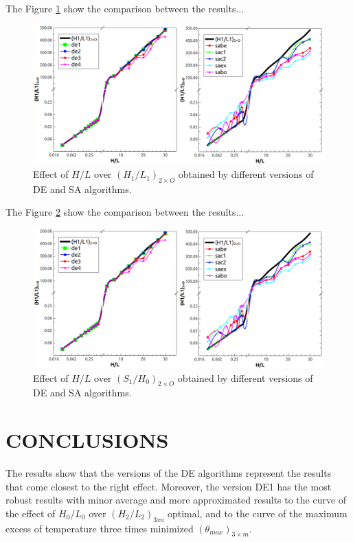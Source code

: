 \documentclass[12pt,fleqn]{article}
\begin{document}
The Figure \ref{figure07} show the comparison between the results...

\begin{figure}[H]
\centering
\includegraphics[width=1\linewidth]{imgs/5dof/de_sa_hl_h1l1.png}
\caption{ {\small Effect of $H/L$ over ${(H_{1}/L_{1})_{2\times O}}$ obtained by different versions of DE and SA algorithms.}}
\label{figure07}
\end{figure}


The Figure \ref{figure08} show the comparison between the results...


\begin{figure}[H]
\centering
\includegraphics[width=1\linewidth]{imgs/5dof/de_sa_hl_h1l1.png}
\caption{ {\small Effect of $H/L$ over ${(S_{1}/H_{0})_{2\times O}}$ obtained by different versions of DE and SA algorithms.}}
\label{figure08}
\end{figure}

\section{CONCLUSIONS}

The results show that the versions of the DE algorithms represent the results that come closest to the right effect. Moreover, the version DE1 has the most robust results with minor average and more approximated results to the curve of the effect of $H_{0}/L_{0}$ over $(H_{2}/L_{2})_{3xo}$ optimal, and to the curve of the maximum excess of temperature three times minimized $({\theta}_{max})_{3\times m}$.
\end{document}
